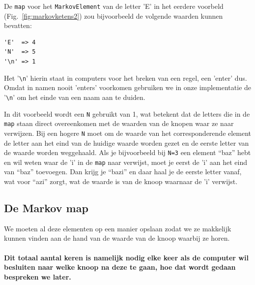 \documentclass{article}
\begin{document}
De \texttt{map} voor het \texttt{MarkovElement} van de letter 'E' in het eerdere voorbeld (Fig.~\ref{fig:markovketens2}) zou bijvoorbeeld de volgende waarden kunnen bevatten:

\begin{lstlisting}
'E'  => 4
'N'  => 5
'\n' => 1
\end{lstlisting}

Het '\texttt{\textbackslash n}' hierin staat in computers voor het breken van een regel, een 'enter' dus. Omdat in namen nooit 'enters' voorkomen gebruiken we in onze implementatie de '\texttt{\textbackslash n}' om het einde van een naam aan te duiden.

In dit voorbeeld wordt een \texttt{N} gebruikt van 1, wat betekent dat de letters die in de \texttt{map} staan direct overeenkomen met de waarden van de knopen waar ze naar verwijzen. Bij een hogere \texttt{N} moet om de waarde van het corresponderende element de letter aan het eind van de huidige waarde worden gezet en de eerste letter van de waarde worden weggehaald. Als je bijvoorbeeld bij \texttt{N=3} een element “baz” hebt en wil weten waar de 'i' in de \texttt{map} naar verwijst, moet je eerst de 'i' aan het eind van “baz” toevoegen. Dan krijg je “bazi” en daar haal je de eerste letter vanaf, wat voor “azi” zorgt, wat de waarde is van de knoop waarnaar de 'i' verwijst.

\subsection{De Markov map}

We moeten al deze elementen op een manier opslaan zodat we ze makkelijk kunnen vinden aan de hand van de waarde van de knoop waarbij ze horen. 
\\\\
\textbf{Dit totaal aantal keren is namelijk nodig elke keer als de computer wil besluiten naar welke knoop na deze te gaan, hoe dat wordt gedaan bespreken we later.}

\newpage


\end{document}
